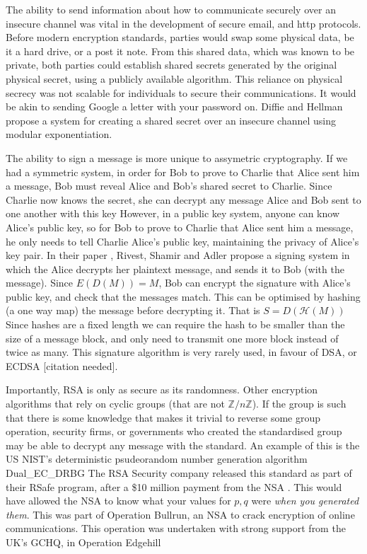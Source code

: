 \documentclass{article}
\begin{document}
The ability to send information about how to communicate securely over an insecure channel was vital in the development of secure email, and http protocols.
Before modern encryption standards, parties would swap some physical data, be it a hard drive, or a post it note.
From this shared data, which was known to be private,
both parties could establish shared secrets generated by the original physical secret,
using a publicly available algorithm.
This reliance on physical secrecy was not scalable for individuals to secure their communications.
It would be akin to sending Google a letter with your password on.
Diffie and Hellman \cite{Directions} propose a system for creating a shared secret over an insecure channel using modular exponentiation.

The ability to sign a message is more unique to assymetric cryptography.
If we had a symmetric system, in order for Bob to prove to Charlie that Alice sent him a message,
Bob must reveal Alice and Bob's shared secret to Charlie.
Since Charlie now knows the secret, she can decrypt any message Alice and Bob sent to one another with this key
However, in a public key system, anyone can know Alice's public key, so for Bob to prove to Charlie that Alice sent him a message,
he only needs to tell Charlie Alice's public key, maintaining the privacy of Alice's key pair.
In their paper \cite{RSA}, Rivest, Shamir and Adler propose a signing system
in which the Alice decrypts her plaintext message, and sends it to Bob (with the message).
Since $E(D(M)) = M$, Bob can encrypt the signature with Alice's public key, and check that the messages match.
This can be optimised by hashing (a one way map) the message before decrypting it. That is $S = D(\mathcal{H}(M))$
Since hashes are a fixed length we can require the hash to be smaller than the size of a message block,
and only need to transmit one more block instead of twice as many.
This signature algorithm is very rarely used, in favour of DSA, or ECDSA [citation needed].

Importantly, RSA is only as secure as its randomness.
Other encryption algorithms that rely on cyclic groups (that are not $\mathbb{Z}/n\mathbb{Z}$).
If the group is such that there is some knowledge that makes it trivial to reverse some group operation,
security firms, or governments who created the standardised group may be able to decrypt any message with the standard.
An example of this is the US NIST's deterministic psudeorandom number generation algorithm Dual\_EC\_DRBG
The RSA Security company released this standard as part of their RSafe program, after a \$10 million payment from the NSA \cite{Reuters}.
This would have allowed the NSA to know what your values for $p, q$ were \emph{when you generated them}.
This was part of Operation Bullrun, an NSA to crack encryption of online communications.
This operation was undertaken with strong support from the UK's GCHQ, in Operation Edgehill \cite{Bullrun}
\end{document}
